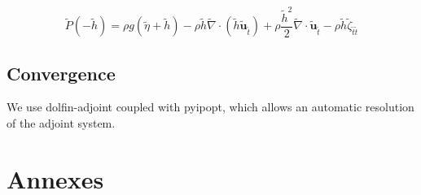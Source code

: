 \documentclass[11pt,a4paper]{article}
\begin{document}
			\begin{equation}
				\tilde{P}(-\tilde{h}) = \rho g (\tilde{\eta} + \tilde{h} ) - \rho \tilde h \tilde {\nabla} \cdot (\tilde h \tilde{\mathbf{u}}_{\tilde t}) + \rho \frac{\tilde h^2}{2} \tilde \nabla \cdot \tilde{\mathbf{u}}_{\tilde t} - \rho \tilde h \tilde \zeta_{\tilde t \tilde t}
			\end{equation}
					
				\subsection{Convergence}
					We use dolfin-adjoint coupled with pyipopt, which allows an automatic resolution of the adjoint system.
					
					
					
					
		
	
		\pagebreak	
	
	\section*{Annexes}
		
		\pagebreak
		
		 
		
		
		\appendix
\end{document}
